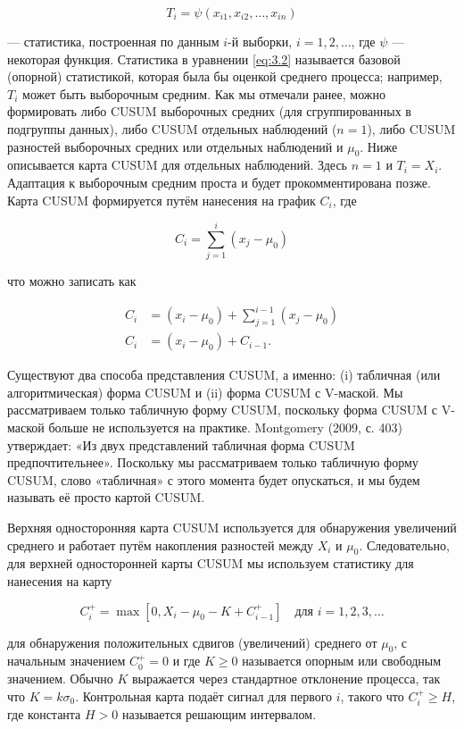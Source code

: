 \begin{equation}
	T_i = \psi(x_{i1}, x_{i2}, \ldots, x_{in})
	\label{eq:3.2}
\end{equation}

— статистика, построенная по данным \(i\)-й выборки, \(i = 1, 2, \ldots\), где \(\psi\) — некоторая функция. Статистика в уравнении \eqref{eq:3.2} называется базовой (опорной) статистикой, которая была бы оценкой среднего процесса; например, \(T_i\) может быть выборочным средним. Как мы отмечали ранее, можно формировать либо CUSUM выборочных средних (для сгруппированных в подгруппы данных), либо CUSUM отдельных наблюдений (\(n = 1\)), либо CUSUM разностей выборочных средних или отдельных наблюдений и \(\mu_0\). Ниже описывается карта CUSUM для отдельных наблюдений. Здесь \(n = 1\) и \(T_i = X_i\). Адаптация к выборочным средним проста и будет прокомментирована позже. Карта CUSUM формируется путём нанесения на график \(C_i\), где

\[
C_i = \sum_{j=1}^{i}(x_j - \mu_0)
\]

что можно записать как

\[
\begin{aligned}
	C_i &= (x_i - \mu_0) + \sum_{j=1}^{i-1}(x_j - \mu_0) \\
	C_i &= (x_i - \mu_0) + C_{i-1}.
\end{aligned}
\]

Существуют два способа представления CUSUM, а именно: (i) табличная (или алгоритмическая) форма CUSUM и (ii) форма CUSUM с V-маской. Мы рассматриваем только табличную форму CUSUM, поскольку форма CUSUM с V-маской больше не используется на практике. Montgomery (2009, с. 403) утверждает: «Из двух представлений табличная форма CUSUM предпочтительнее». Поскольку мы рассматриваем только табличную форму CUSUM, слово «табличная» с этого момента будет опускаться, и мы будем называть её просто картой CUSUM.

Верхняя односторонняя карта CUSUM используется для обнаружения увеличений среднего и работает путём накопления разностей между \(X_i\) и \(\mu_0\). Следовательно, для верхней односторонней карты CUSUM мы используем статистику для нанесения на карту

\begin{equation}
	C_i^{+} = \max[0, X_i - \mu_0 - K + C_{i-1}^{+}] \quad \text{для } i = 1, 2, 3, \ldots
	\label{eq:3.3}
\end{equation}

для обнаружения положительных сдвигов (увеличений) среднего от \(\mu_0\), с начальным значением \(C_0^+ = 0\) и где \(K \geq 0\) называется опорным или свободным значением. Обычно \(K\) выражается через стандартное отклонение процесса, так что \(K = k\sigma_0\). Контрольная карта подаёт сигнал для первого \(i\), такого что \(C_i^+ \geq H\), где константа \(H > 0\) называется решающим интервалом.

